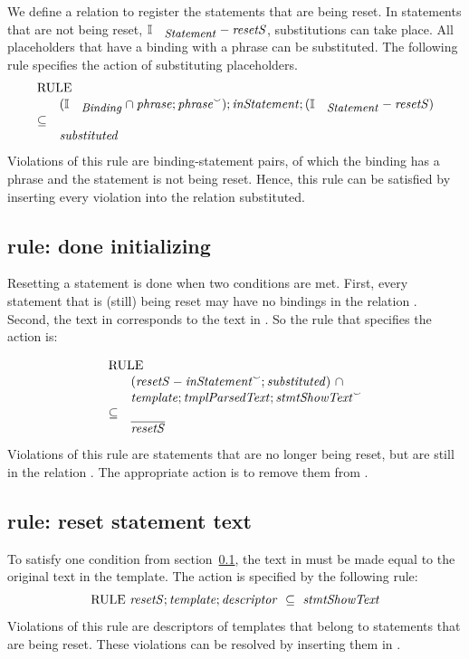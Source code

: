\documentclass{svproc}
\begin{document}
	We define a relation  to register the statements that are being reset.
    In statements that are not being reset, $\ident{Statement}-\id{resetS}$, substitutions can take place.
	All placeholders that have a binding with a phrase can be substituted. 
	The following rule specifies the action of substituting placeholders.
\begin{displaymath}
\begin{array}{rl}
\multicolumn{2}{l}{\text{RULE}}\\
&(\ident{Binding}\cap \id{phrase} ;\flip{\id{phrase}});\id{inStatement} ;(\ident{Statement} - \id{resetS})\\
\subs\\
&\id{substituted}
\end{array}
\end{displaymath}
	Violations of this rule are binding-statement pairs, of which the binding has a phrase and the statement is not being reset.
	Hence, this rule can be satisfied by inserting every violation into the relation substituted.

\subsection{rule: done initializing}
\label{rule: done initializing}
	Resetting a statement is done when two conditions are met.
	First, every statement that is (still) being reset may have no bindings in the relation .
	Second, the text in  corresponds to the text in .
	So the rule that specifies the action is:

\begin{displaymath}
\begin{array}{rl}
\multicolumn{2}{l}{\text{RULE}}\\
&(\id{resetS} - \flip{\id{inStatement}};\id{substituted})\ \cap\\
&\id{template} ;\id{tmplParsedText} ;\flip{\id{stmtShowText}}\\
\subs\\
&\overline{\id{resetS}}
\end{array}
\end{displaymath}
	Violations of this rule are statements that are no longer being reset, but are still in the relation .
	The appropriate action is to remove them from .

\subsection{rule: reset statement text}
\label{rule: reset statement text}
	To satisfy one condition from section~\ref{rule: done initializing},
	the text in  must be made equal to the original text in the template.
	The action is specified by the following rule:
\[\text{RULE}\ \id{resetS} ;\id{template} ;\id{descriptor}\ \subs\ \id{stmtShowText} \]
	Violations of this rule are descriptors of templates that belong to statements that are being reset.
	These violations can be resolved by inserting them in .
\end{document}
